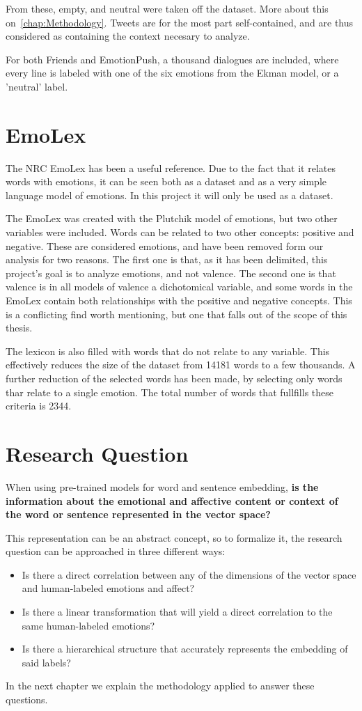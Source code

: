 From these, empty, and neutral were taken off the dataset. More about this on~\ref{chap:Methodology}. Tweets are for the most part self-contained, and are thus considered as containing the context necesary to analyze.

For both Friends and EmotionPush, a thousand dialogues are included, where every line is labeled with one of the six emotions from the Ekman model, or a 'neutral' label.

\section{EmoLex}\label{sec:Research Question}
The NRC EmoLex has been a useful reference. Due to the fact that it relates words with emotions, it can be seen both as a dataset and as a very simple language model of emotions. In this project it will only be used as a dataset.

The EmoLex was created with the Plutchik model of emotions, but two other variables were included. Words can be related to two other concepts: positive and negative. These are considered emotions, and have been removed form our analysis for two reasons. The first one is that, as it has been delimited, this project's goal is to analyze emotions, and not valence. The second one is that valence is in all models of valence a dichotomical variable, and some words in the EmoLex contain both relationships with the positive and negative concepts. This is a conflicting find worth mentioning, but one that falls out of the scope of this thesis.

The lexicon is also filled with words that do not relate to any variable. This effectively reduces the size of the dataset from 14181 words to a few thousands. A further reduction of the selected words has been made, by selecting only words thar relate to a single emotion. The total number of words that fullfills these criteria is 2344.

\section{Research Question}\label{sec:Research Question}
When using pre-trained models for word and sentence embedding, \textbf{is the information about the emotional and affective content or context of the word or sentence represented in the vector space?}

This representation can be an abstract concept, so to formalize it, the research question can be approached in three different ways:

\begin{itemize}
  \item Is there a direct correlation between any of the dimensions of the vector space and human-labeled emotions and affect?
  \item Is there a linear transformation that will yield a direct correlation to the same human-labeled emotions?
  \item Is there a hierarchical structure that accurately represents the embedding of said labels?
\end{itemize}

In the next chapter we explain the methodology applied to answer these questions.
